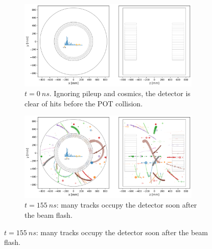 \begin{figure}
    \centering
    
    \captionsetup[subfigure]{justification=centering}
    \begin{subfigure}[t]{0.49\textwidth}
    \centering
    \includegraphics[width=0.95\textwidth]{chapter3/frame_005.png}
    \caption{$t=\SI{0}{ns}$. Ignoring pileup and cosmics, the detector is clear of hits before the POT collision.}
    \end{subfigure}
    \hfill
    \begin{subfigure}[t]{0.49\textwidth}
    \centering
    \includegraphics[width=0.95\textwidth]{chapter3/frame_036.png}  
    \caption{$t=\SI{155}{ns}$: many tracks occupy the detector soon after the beam flash.}
    \end{subfigure}
    
    \vspace{0.3cm}
    

\end{figure}

